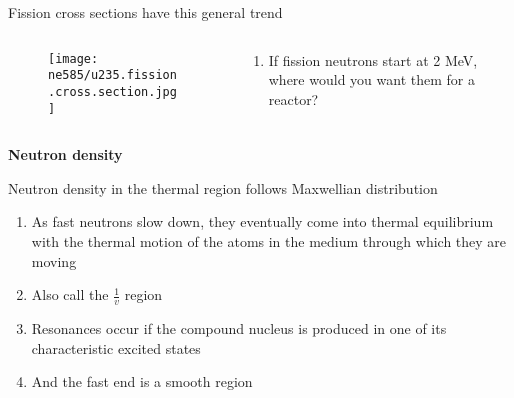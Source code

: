 \documentclass[aspectratio=1610,pdftex,dvipsnames,compress,xcolor={dvipsnames}]{beamer}
\begin{document}
\addtocounter{framenumber}{-1} 
\begin{frame}{Fission cross sections have this general trend}
    \begin{columns}

        \begin{column}{0.60\textwidth}
            \begin{figure}
                \centering
                \texttt{[image: ne585/u235.fission.cross.section.jpg]}
            \end{figure}
        \end{column}

        \begin{column}{0.40\textwidth}
            \begin{enumerate}[series=outerlist,topsep=0pt,itemsep=21pt,leftmargin=*,label=(\arabic*)]
                \item[]If fission neutrons start at 2 MeV, where would you want them for a reactor?
            \end{enumerate}
        \end{column}

    \end{columns}
\end{frame}


\begin{frame}[plain]{}
    \centering\LARGE\textbf{Neutron density}
\end{frame}


\addtocounter{framenumber}{-1} 
\begin{frame}{Neutron density in the thermal region follows Maxwellian distribution}
    \begin{enumerate}[series=outerlist,topsep=0pt,itemsep=21pt,leftmargin=*,label=(\arabic*)]
        \item[]As fast neutrons slow down, they eventually come into thermal equilibrium with the thermal motion of the atoms in the medium through which they are moving
        \item[]Also call the $\frac{1}{v}$ region
        \item[]Resonances occur if the compound nucleus is produced in one of its characteristic excited states
        \item[]And the fast end is a smooth region
    \end{enumerate}
\end{frame}
\end{document}
